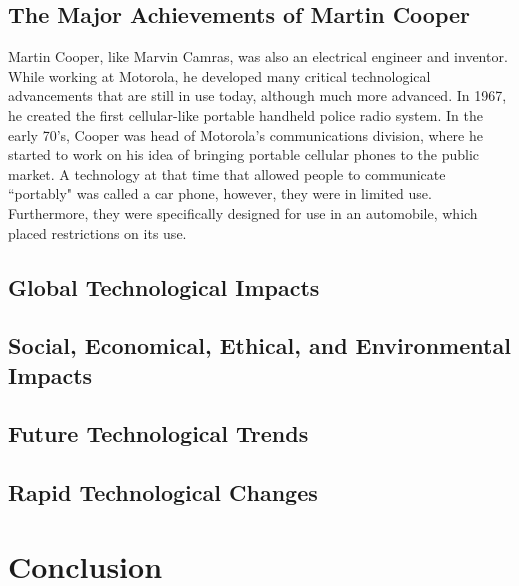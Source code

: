 \documentclass[12pt,letter]{article}
\begin{document}
\subsection{The Major Achievements of Martin Cooper}
Martin Cooper, like Marvin Camras, was also an electrical engineer and inventor. While working at Motorola, he developed many critical technological advancements that are still in use today, although much more advanced. In 1967, he created the first cellular-like portable handheld police radio system\cite{coop}. In the early 70's, Cooper was head of Motorola's communications division, where he started to work on his idea of bringing portable cellular phones to the public market. A technology at that time that allowed people to communicate ``portably" was called a car phone, however, they were in limited use. Furthermore, they were specifically designed for use in an automobile, which placed restrictions on its use.
\subsection{Global Technological Impacts}
\subsection{Social, Economical, Ethical, and Environmental Impacts}
\subsection{Future Technological Trends}
\subsection{Rapid Technological Changes}
\section{Conclusion}



\end{document}
